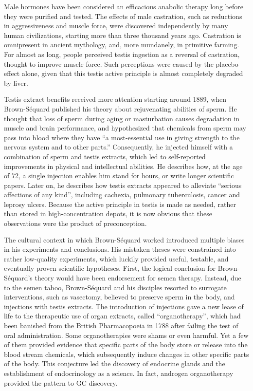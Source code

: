 \documentclass[12pt,english]{report}\usepackage[]{graphicx}\usepackage[]{color}
\begin{document}
Male hormones have been considered an efficacious anabolic therapy
long before they were purified and tested. The effects of male castration,
such as reductions in aggressiveness and muscle force, were discovered
independently by many human civilizations, starting more than three
thousand years ago. Castration is omnipresent in ancient mythology,
and, more mundanely, in primitive farming. For almost as long, people
perceived testis ingestion as a reversal of castration, thought to
improve muscle force. Such perceptions were caused by the placebo
effect alone, given that this testis active principle is almost completely
degraded by liver.

Testis extract benefits received more attention starting around 1889,
when Brown-Séquard published his theory about rejuvenating abilities
of sperm. He thought that loss of sperm during aging or masturbation
causes degradation in muscle and brain performance, and hypothesized
that chemicals from sperm may pass into blood where they have ``a
most-essential use in giving strength to the nervous system and to
other parts.'' Consequently, he injected himself with a combination
of sperm and testis extracts, which led to self-reported improvements
in physical and intellectual abilities\citep{brown-sequard1889note}.
He describes how, at the age of 72, a single injection enables him
stand for hours, or write longer scientific papers. Later on, he describes
how testis extracts appeared to alleviate ``serious affections of
any kind'', including cachexia, pulmonary tuberculosis, cancer and
leprosy ulcers\citep{brown-sequard1893new}. Because the active principle
in testis is made as needed, rather than stored in high-concentration
depots, it is now obvious that these observations were the product
of preconception.

The cultural context in which Brown-Séquard worked introduced multiple
biases in his experiments and conclusions. His mistaken theses were
constrained into rather low-quality experiments, which luckily provided
useful, testable, and eventually proven scientific hypotheses. First,
the logical conclusion for Brown-Séquard's theory would have been
endorsement for semen therapy. Instead, due to the semen taboo, Brown-Séquard
and his disciples resorted to surrogate interventions, such as vasectomy,
believed to preserve sperm in the body, and injections with testis
extracts. The introduction of injections gave a new lease of life
to the therapeutic use of organ extracts, called ``organotherapy'',
which had been banished from the British Pharmacopoeia in 1788 after
failing the test of oral administration. Some organotherapies were
shams or even harmful. Yet a few of them provided evidence that specific
parts of the body store or release into the blood stream chemicals,
which subsequently induce changes in other specific parts of the body.
This conjecture led the discovery of endocrine glands and the establishment
of endocrinology as a science. In fact, androgen organotherapy provided
the pattern to GC discovery.
\end{document}
